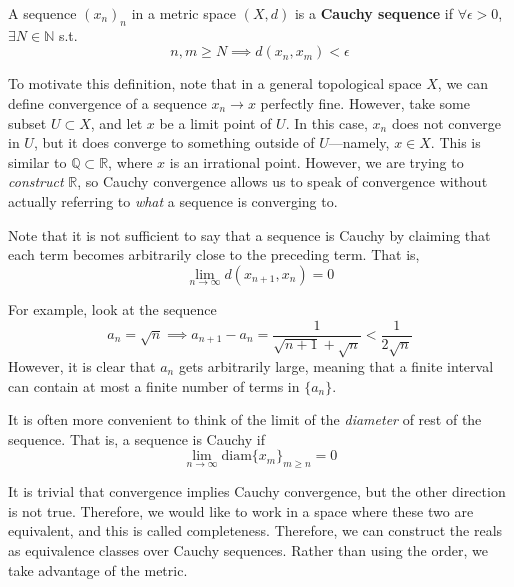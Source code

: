   \begin{definition}
    A sequence $(x_n)_n$ in a metric space $(X, d)$ is a \textbf{Cauchy sequence} if $\forall \epsilon > 0$, $\exists N \in \mathbb{N}$ s.t.  
    \begin{equation}
      n, m \geq N \implies d(x_n, x_m) < \epsilon
    \end{equation}
  \end{definition}

  To motivate this definition, note that in a general topological space $X$, we can define convergence of a sequence $x_n \to x$ perfectly fine. However, take some subset $U \subset X$, and let $x$ be a limit point of $U$. In this case, $x_n$ does not converge in $U$, but it does converge to something outside of $U$---namely, $x \in X$. This is similar to $\mathbb{Q} \subset \mathbb{R}$, where $x$ is an irrational point. However, we are trying to \textit{construct} $\mathbb{R}$, so Cauchy convergence allows us to speak of convergence without actually referring to \textit{what} a sequence is converging to. 

  Note that it is not sufficient to say that a sequence is Cauchy by claiming that each term becomes arbitrarily close to the preceding term. That is, 
  \begin{equation}
    \lim_{n \rightarrow \infty} d(x_{n+1}, x_{n}) = 0
  \end{equation}

  \begin{example}
    For example, look at the sequence 
    \begin{equation}
      a_n = \sqrt{n} \implies a_{n+1} - a_{n} = \frac{1}{\sqrt{n+1} + \sqrt{n}} < \frac{1}{2\sqrt{n}}
    \end{equation}
    However, it is clear that $a_n$ gets arbitrarily large, meaning that a finite interval can contain at most a finite number of terms in $\{a_n\}$. 
  \end{example}

  It is often more convenient to think of the limit of the \textit{diameter} of rest of the sequence. That is, a sequence is Cauchy if 
  \begin{equation}
    \lim_{n \rightarrow \infty} \mathrm{diam}\{x_{m}\}_{m \geq n} = 0
  \end{equation}

  It is trivial that convergence implies Cauchy convergence, but the other direction is not true. Therefore, we would like to work in a space where these two are equivalent, and this is called completeness. Therefore, we can construct the reals as equivalence classes over Cauchy sequences. Rather than using the order, we take advantage of the metric. 

